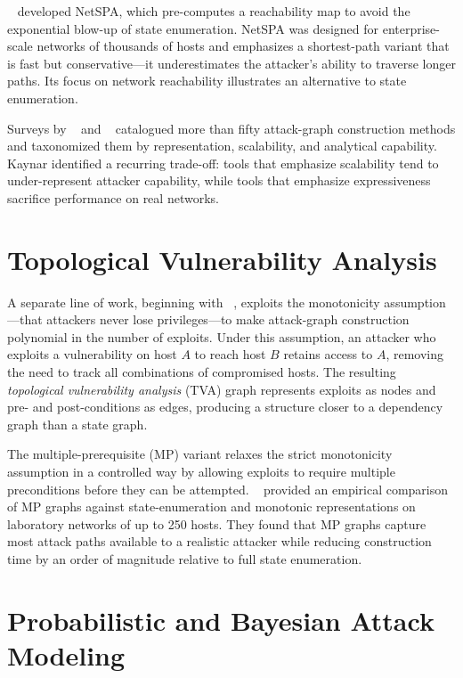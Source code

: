 \citeauthor{homer08netspa}~\cite{homer08netspa} developed NetSPA, which pre-computes a reachability map to avoid the exponential blow-up of state enumeration. NetSPA was designed for enterprise-scale networks of thousands of hosts and emphasizes a shortest-path variant that is fast but conservative---it underestimates the attacker's ability to traverse longer paths. Its focus on network reachability illustrates an alternative to state enumeration.

Surveys by \citeauthor{lippmann05}~\cite{lippmann05} and \citeauthor{kaynar16}~\cite{kaynar16} catalogued more than fifty attack-graph construction methods and taxonomized them by representation, scalability, and analytical capability. Kaynar identified a recurring trade-off: tools that emphasize scalability tend to under-represent attacker capability, while tools that emphasize expressiveness sacrifice performance on real networks.

\section{Topological Vulnerability Analysis}

A separate line of work, beginning with \citeauthor{ammann02tva}~\cite{ammann02tva}, exploits the monotonicity assumption---that attackers never lose privileges---to make attack-graph construction polynomial in the number of exploits. Under this assumption, an attacker who exploits a vulnerability on host $A$ to reach host $B$ retains access to $A$, removing the need to track all combinations of compromised hosts. The resulting \emph{topological vulnerability analysis} (TVA) graph represents exploits as nodes and pre- and post-conditions as edges, producing a structure closer to a dependency graph than a state graph.

The multiple-prerequisite (MP) variant relaxes the strict monotonicity assumption in a controlled way by allowing exploits to require multiple preconditions before they can be attempted. \citeauthor{ingols06mpg}~\cite{ingols06mpg} provided an empirical comparison of MP graphs against state-enumeration and monotonic representations on laboratory networks of up to 250 hosts. They found that MP graphs capture most attack paths available to a realistic attacker while reducing construction time by an order of magnitude relative to full state enumeration.

\section{Probabilistic and Bayesian Attack Modeling}


